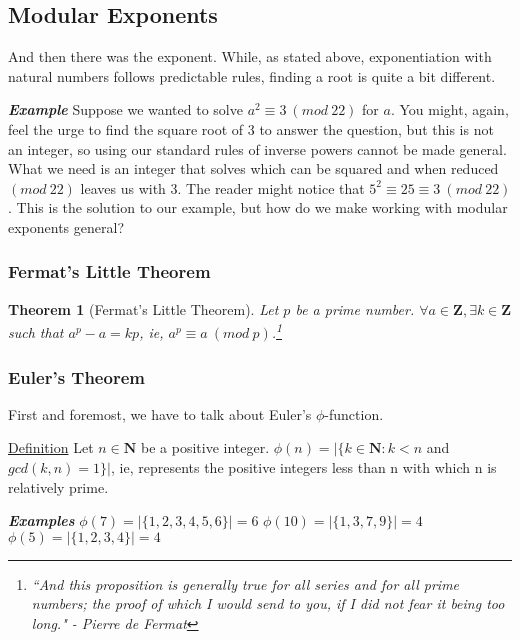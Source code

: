 \documentclass{article}
\newtheorem{thrm}{\textbf{Theorem}}
\begin{document}
        \subsection{Modular Exponents}
            And then there was the exponent.  While, as stated above, exponentiation with natural numbers follows predictable rules, finding a root is quite a bit different.
            
            \textbf{\textit{Example}} Suppose we wanted to solve $a^{2}\equiv 3\ (mod\ 22)$  for $a$.  
            You might, again, feel the urge to find the square root of 3 to answer the question, but this is not an integer, so using our standard rules of inverse powers cannot be made general.  
            What we need is an integer that solves which can be squared and when reduced $(mod\ 22)$ leaves us with 3.  
            The reader might notice that $5^2\equiv 25 \equiv 3\ (mod\ 22)$.  This is the solution to our example, but how do we make working with modular exponents general?
            
            \subsubsection{Fermat's Little Theorem}
	            \begin{thrm}[Fermat's Little Theorem]
	            	Let $p$ be a prime number.  $\forall a\in\mathbf{Z}, \exists k\in\mathbf{Z}$ such that $a^p-a=kp$, ie, $a^p\equiv a\ (mod\ p)$.\footnote{``And this proposition is generally true for all series and for all prime numbers; the proof of which I would send to you, if I did not fear it being too long." - Pierre de Fermat}\cite{Long}
	            \end{thrm}
	            
            
            
            \subsubsection{Euler's Theorem}
                First and foremost, we have to talk about Euler's $\phi$-function.
                
                \noindent\underline{Definition} Let $n\in\mathbf{N}$ be a positive integer. $\phi(n)=|\{k\in\mathbf{N}:k<n$ and $gcd(k,n)=1\}|$, ie, represents the positive integers less than n with which n is relatively prime.
                
                \textbf{\textit{Examples}}
                \hspace*{\fill}
                    {$ \phi(7)=|\{1,2,3,4,5,6\}|=6$} \hfill {$ \phi(10)=|\{1,3,7,9\}|=4 $} \hfill {$ \phi(5)=|\{1,2,3,4\}|=4 $}
                \hspace*{\fill}
                
\end{document}
